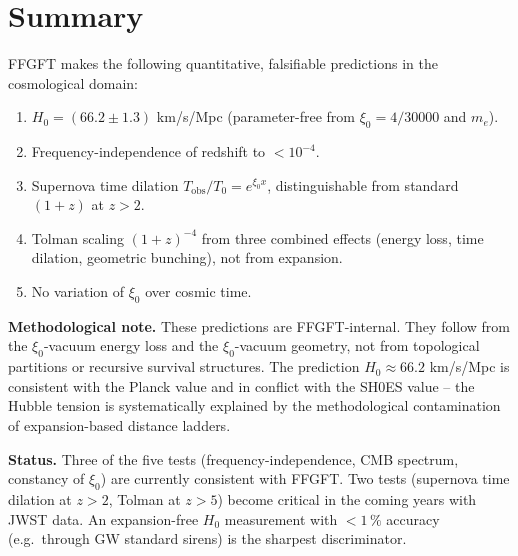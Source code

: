 \section{Summary}

FFGFT makes the following quantitative, falsifiable predictions in
the cosmological domain:

\begin{enumerate}[leftmargin=2em,itemsep=2pt,topsep=2pt]
  \item $H_0 = (66.2 \pm 1.3)$ km/s/Mpc
        (parameter-free from $\xi_0 = 4/30000$ and $m_e$).
  \item Frequency-independence of redshift to $< 10^{-4}$.
  \item Supernova time dilation $T_{\text{obs}}/T_0 = e^{\xi_0 x}$,
        distinguishable from standard $(1+z)$ at $z > 2$.
  \item Tolman scaling $(1+z)^{-4}$ from three combined effects
        (energy loss, time dilation, geometric bunching), not from
        expansion.
  \item No variation of $\xi_0$ over cosmic time.
\end{enumerate}

\textbf{Methodological note.} These predictions are FFGFT-internal.
They follow from the $\xi_0$-vacuum energy loss and the $\xi_0$-vacuum
geometry, not from topological partitions or recursive survival
structures. The prediction $H_0 \approx 66.2$ km/s/Mpc is consistent
with the Planck value and in conflict with the SH0ES value -- the
Hubble tension is systematically explained by the methodological
contamination of expansion-based distance ladders.

\textbf{Status.} Three of the five tests (frequency-independence, CMB
spectrum, constancy of $\xi_0$) are currently consistent with FFGFT.
Two tests (supernova time dilation at $z > 2$, Tolman at $z > 5$)
become critical in the coming years with JWST data. An
expansion-free $H_0$ measurement with $< 1\,\%$ accuracy (e.g.\
through GW standard sirens) is the sharpest discriminator.
